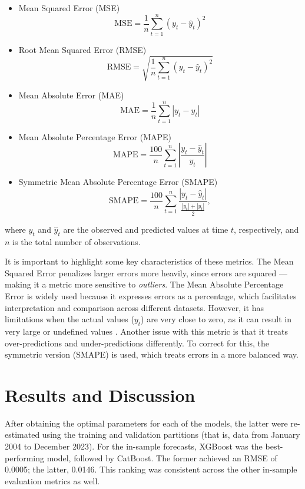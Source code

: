 \begin{itemize}
    \item Mean Squared Error (MSE)
        \begin{equation}
        \text{MSE} = \frac{1}{n} \sum_{t=1}^{n} (y_t - \hat{y}_t)^2
        \end{equation}
    \item Root Mean Squared Error (RMSE)
        \begin{equation}
            \text{RMSE} = \sqrt{\frac{1}{n} \sum_{t=1}^{n} (y_t - \hat{y}_t)^2}
        \end{equation}
    \item Mean Absolute Error (MAE)
        \begin{equation}
            \text{MAE} = \frac{1}{n} \sum_{t=1}^{n} |y_t - \hat{y}_t|
        \end{equation}
    \item Mean Absolute Percentage Error (MAPE)
        \begin{equation}
            \text{MAPE} = \frac{100}{n} \sum_{t=1}^{n} \left| \frac{y_t - \hat{y}_t}{y_t} \right|
        \end{equation}
    \item Symmetric Mean Absolute Percentage Error (SMAPE)
        \begin{equation}
            \text{SMAPE} = \frac{100}{n} \sum_{t=1}^{n} \frac{|y_t - \hat{y}_t|}{\frac{|y_t| + |\hat{y}_t|}{2}},
        \end{equation}
\end{itemize}
where $y_t$ and $\hat{y}_t$ are the observed and predicted values at time $t$, respectively, and $n$ is the total number of observations.

It is important to highlight some key characteristics of these metrics. The Mean Squared Error penalizes larger errors more heavily, since errors are squared — making it a metric more sensitive to \textit{outliers}. The Mean Absolute Percentage Error is widely used because it expresses errors as a percentage, which facilitates interpretation and comparison across different datasets. However, it has limitations when the actual values ($y_t$) are very close to zero, as it can result in very large or undefined values \cite{HYNDMAN2006679}. Another issue with this metric is that it treats over-predictions and under-predictions differently. To correct for this, the symmetric version (SMAPE) is used, which treats errors in a more balanced way.

\section{Results and Discussion}
After obtaining the optimal parameters for each of the models, the latter were re-estimated using the training and validation partitions (that is, data from January 2004 to December 2023). For the in-sample forecasts, XGBoost was the best-performing model, followed by CatBoost. The former achieved an RMSE of 0.0005; the latter, 0.0146. This ranking was consistent across the other in-sample evaluation metrics as well.

